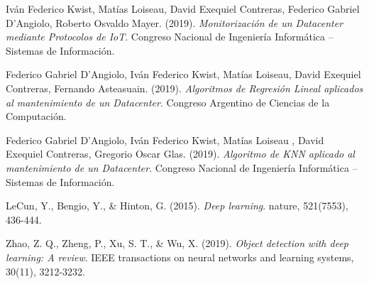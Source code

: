 \documentclass{article} %
\begin{document}
\cleardoublepage

\begin{thebibliography}{9}

Iván Federico Kwist, Matías Loiseau, David Exequiel Contreras, Federico Gabriel D’Angiolo,  Roberto Osvaldo Mayer. (2019). \textit{Monitorización de un Datacenter mediante Protocolos de IoT}. Congreso Nacional de Ingeniería Informática – Sistemas de Información.

Federico Gabriel D’Angiolo, Iván Federico Kwist, Matías Loiseau, David Exequiel Contreras, Fernando Asteasuain. (2019). \textit{Algoritmos de Regresión Lineal aplicados al mantenimiento de un Datacenter}. Congreso Argentino de Ciencias de la Computación.

Federico Gabriel D’Angiolo, Iván Federico Kwist, Matías Loiseau , David Exequiel Contreras, Gregorio Oscar Glas. (2019). \textit{Algoritmo de KNN aplicado al mantenimiento de un Datacenter}. Congreso Nacional de Ingeniería Informática – Sistemas de Información.

LeCun, Y., Bengio, Y., \& Hinton, G. (2015). \textit{Deep learning}. nature, 521(7553), 436-444.

Zhao, Z. Q., Zheng, P., Xu, S. T., \& Wu, X. (2019). \textit{Object detection with deep learning: A review}. IEEE transactions on neural networks and learning systems, 30(11), 3212-3232.

\end{thebibliography}
\end{document}

